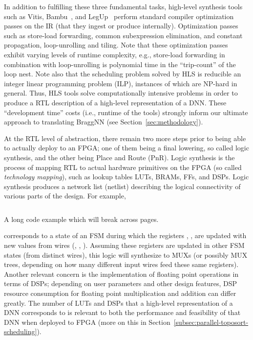 In addition to fulfilling these three fundamental tasks, high-level synthesis tools such as Vitis, Bambu~\cite{ferrandi2021bambu}, and LegUp~\cite{10.1145/2514740} perform standard compiler optimization passes on the IR (that they ingest or produce internally).
Optimization passes such as store-load forwarding, common subexpression elimination, and constant propagation, loop-unrolling and tiling.
Note that these optimization passes exhibit varying levels of runtime complexity, e.g., store-load forwarding in combination with loop-unrolling is polynomial time in the ``trip-count'' of the loop nest.
Note also that the scheduling problem solved by HLS is reducible an integer linear programming problem (ILP), instances of which are NP-hard in general.
Thus, HLS tools solve computationally intensive problems in order to produce a RTL description of a high-level representation of a DNN.
These ``development time'' costs (i.e., runtime of the tools) strongly inform our ultimate approach to translating BraggNN (see Section~\ref{sec:methodology}). 

At the RTL level of abstraction, there remain two more steps prior to being able to actually deploy to an FPGA; one of them being a final lowering, so called logic synthesis, and the other being Place and Route (PnR).
Logic synthesis is the process of mapping RTL to actual hardware primitives on the FPGA (so called \emph{technology mapping}), such as lookup tables LUTs, BRAMs, FFs, and DSPs.
Logic synthesis produces a network list (netlist) describing the logical connectivity of various parts of the design.
For example,
\begin{longlisting}
	\inputminted[autogobble,xleftmargin=0.2\columnwidth,xrightmargin=0.2\columnwidth,frame=lines]{verilog}{sources/always.v}
	\caption[Long Code Example]{A long code example which will break across pages.}
	\label{lst:long}
\end{longlisting}
\noindent corresponds to a state of an FSM during which the registers , ,  are updated with new values from wires (, , ).
Assuming these registers are updated in other FSM states (from distinct wires), this logic will synthesize to MUXs (or possibly MUX trees, depending on how many different input wires feed these same registers).
Another relevant concern is the implementation of floating point operations in terms of DSPs; depending on user parameters and other design features, DSP resource consumption for floating point multiplication and addition can differ greatly.
The number of LUTs and DSPs that a high-level representation of a DNN corresponds to is relevant to both the performance and feasibility of that DNN when deployed to FPGA (more on this in Section~\ref{subsec:parallel-toposort-scheduling}).

